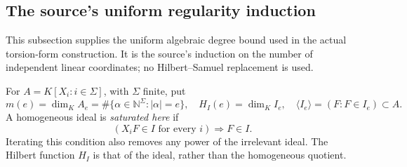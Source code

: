 \subsection{The source's uniform regularity induction}
\label{subsec:ftb-uniform-regularity-induction}

This subsection supplies the uniform algebraic degree bound used
in the actual torsion-form construction.
It is the source's induction on the number of independent linear
coordinates; no Hilbert--Samuel replacement is used.

For \(A=K[X_i:i\in\Sigma]\), with \(\Sigma\) finite, put
\[
 m(e)=\dim_KA_e=\#\{\alpha\in\mathbb N^\Sigma:|\alpha|=e\},
 \quad H_I(e)=\dim_K I_e,\quad
             \langle I_e\rangle=(F:F\in I_e)\subset A.
\]
A homogeneous ideal is \emph{saturated here} if
\[
                    (X_iF\in I\text{ for every }i)
                                      \Longrightarrow F\in I.
 \tag{R7}\label{eq:ftb-regularity-saturation}
\]
Iterating this condition also removes any power of the
irrelevant ideal.
The Hilbert function \(H_I\) is that of the ideal, rather
than the homogeneous quotient.


